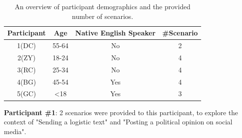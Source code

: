 \documentclass[acmsmall,screen,authorversion,nonacm]{acmart}
\begin{document}
\begin{center}
\begin{table}[h]
\begin{tabular}{|c|c|c|c|}
\hline
\textbf{Participant} & \textbf{Age} & \textbf{Native English Speaker} & \textbf{\#Scenario} \\ \hline
1(DC)                    & 55-64           & No                              & 2                   \\ \hline
2(ZY)                    & 18-24           & No                              & 4                   \\ \hline
3(RC)                    & 25-34           & No                              & 4                   \\ \hline
4(BG)                    & 45-54        & Yes                             & 4                   \\ \hline
5(GC)                    & <18           & Yes                             & 3                   \\ \hline
\end{tabular}
\caption{\label{tab:participant_overview} An overview of participant demographics and the provided number of scenarios. }
\vspace{-1.7pc}
\end{table}
\end{center}

\textbf{Participant \#1}: 2 scenarios were provided to this participant, to explore the context of "Sending a logistic text" and "Posting a political opinion on social media".
\end{document}
